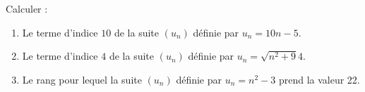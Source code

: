 
\begin{exercice}\label{exosmath-0309}

Calculer :
\begin{enumerate}
    \item
Le terme d'indice $10$ de la suite $(u_n)$ définie par $u_n=10n-5$. 
\item
  Le terme d'indice $4$ de la suite $(u_n)$ définie par $u_n=\sqrt{n^2+9}4$. 
  \item
  Le rang pour lequel la suite $(u_n)$ définie par $u_n=n^2-3$ prend la valeur 22.
\end{enumerate}

\end{exercice}
